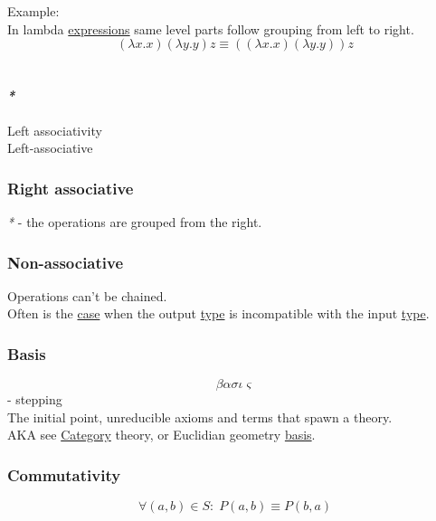 \documentclass[11pt]{article}
\begin{document}
Example:\\
In lambda \hyperref[org3731c99]{expressions} same level parts follow grouping from left to right.\\
$$ (\lambda x . x)(\lambda y . y)z \equiv ((\lambda x . x)(\lambda y . y))z $$\\

\paragraph{\emph{*}}
\label{sec:org0ea6bb1}

\label{org5f40f1f}Left associativity\\
\label{org4715ef1}Left-associative\\

\subsubsection{\label{orgeb040c2}Right associative}
\label{sec:orga0db78b}
\emph{*} - the operations are grouped from the right.\\

\subsubsection{\label{org1e3deae}Non-associative}
\label{sec:orgecb2db0}
Operations can't be chained.\\

Often is the \hyperref[org41d12b6]{case} when the output \hyperref[orgc4aea2f]{type} is incompatible with the input \hyperref[orgc4aea2f]{type}.\\

\subsubsection{\label{org27d3d18}Basis}
\label{sec:orge27b2a4}
$$ \beta\alpha\sigma\iota\varsigma $$ - stepping\\

The initial point, unreducible axioms and terms that spawn a theory.\\
AKA see \hyperref[org0450535]{Category} theory, or Euclidian geometry \hyperref[org27d3d18]{basis}.\\

\subsubsection{\label{org78de62b}Commutativity}
\label{sec:org2308fea}
$$ \forall (a,b) \in S : \; P(a,b) \equiv P(b,a) $$\\
\end{document}
